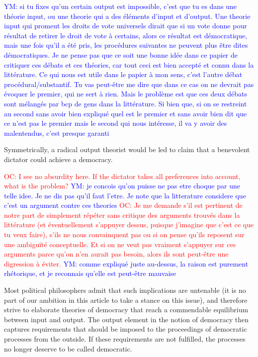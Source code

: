 \documentclass[preprint, french, english, 11pt, authoryear]{elsarticle}%
\newcommand{\commentYM}[1]{\textcolor{blue}{YM: #1}}
\newcommand{\commentOC}[1]{\textcolor{red}{OC: #1}}
\begin{document}
\commentYM{si tu fixes qu'un certain output est impossible, c'est que tu es dans une théorie input, ou une theorie qui a des éléments d'input et d'output. Une theorie input qui promeut les droits de vote universels dirait que si un vote donne pour résultat de retirer le droit de vote à certains, alors ce résultat est démocratique, mais une fois qu'il a été pris, les procédures suivantes ne peuvent plus être dites démocratiques. Je ne pense pas que ce soit une bonne idée dans ce papier de critiquer ces débats et ces théories, car tout ceci est bien accepté et connu dans la littérature. Ce qui nous est utile dans le papier à mon sens, c'est l'autre débat procédural/substantif. Tu vas peut-être me dire que dans ce cas on ne devrait pas évoquer le premier, qui ne sert à rien. Mais le problème est que ces deux débats sont mélangés par bcp de gens dans la littérature. Si bien que, si on se restreint au second sans avoir bien expliqué quel est le premier et sans avoir bien dit que ce n'est pas le premier mais le second qui nous intéresse, il va y avoir des malentendus, c'est presque garanti}

Symmetrically, a radical output theorist would be led to claim that a benevolent dictator could achieve a democracy. 

\commentOC{ I see no absurdity here. If the
dictator takes all preferences into account, what is the
problem?} 
\commentYM{je concois qu'on puisse ne pas etre choque par une telle idee. Je ne dis pas qu'il faut l'etre. Je note que la litterature considere que c'est un argument contre ces theories}
\commentOC{Je me demande s’il est pertinent de notre part de simplement répéter sans critique des arguments trouvés dans la littérature (et éventuellement s’appuyer dessus, puisque j’imagine que c’est ce que tu veux faire), s’ils ne nous convainquent pas ou si on pense qu’ils reposent sur une ambiguïté conceptuelle. Et si on ne veut pas vraiment s’appuyer sur ces arguments parce qu’on n’en aurait pas besoin, alors ils sont peut-être une digression à éviter.} \commentYM{comme expliqué juste au-dessus, la raison est purement rhétorique, et je reconnais qu'elle est peut-être mauvaise}

Most political philosophers admit that such implications are untenable (it is no part of our ambition in this article to take a stance on this issue), and therefore strive to elaborate theories of democracy that reach a commendable equilibrium between input and output. The output element in the notion of democracy then captures requirements that should be imposed to the proceedings of democratic processes from the outside. If these requirements are not fulfilled, the processes no longer deserve to be called democratic. %
\end{document}

